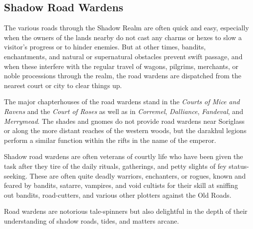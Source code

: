 \documentclass[10pt,a4paper,twoside,bg=print,twocolumn,openany,nodeprecatedcode]{dndbook}
\begin{document}
\subsection{Shadow Road Wardens}
The various roads through the Shadow Realm are often quick and easy, especially when the owners of the lands nearby do not cast any charms or hexes to slow a visitor's progress or to hinder enemies. But at other times, bandits, enchantments, and natural or supernatural obstacles prevent swift passage, and when these interfere with the regular travel of wagons, pilgrims, merchants, or noble processions through the realm, the road wardens are dispatched from the nearest court or city to clear things up.

The major chapterhouses of the road wardens stand in the \textit{Courts of Mice and Ravens} and the \textit{Court of Roses} as well as in \textit{Corremel}, \textit{Dalliance}, \textit{Fandeval}, and \textit{Merrymead}. The shades and gnomes do not provide road wardens near Soriglass or along the more distant reaches of the western woods, but the darakhul legions perform a similar function within the rifts in the name of the emperor.

Shadow road wardens are often veterans of courtly life who have been given the task after they tire of the daily rituals, gatherings, and petty slights of fey status-seeking. These are often quite deadly warriors, enchanters, or rogues, known and feared by bandits, satarre, vampires, and void cultists for their skill at sniffing out bandits, road-cutters, and various other plotters against the Old Roads.

Road wardens are notorious tale-spinners but also delightful in the depth of their understanding of shadow roads, tides, and matters arcane.
\end{document}
